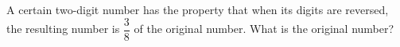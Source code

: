 A certain two-digit number has the property that when its digits are reversed, the resulting number is $\dfrac{3}{8}$ of the original number. What is the original number?
